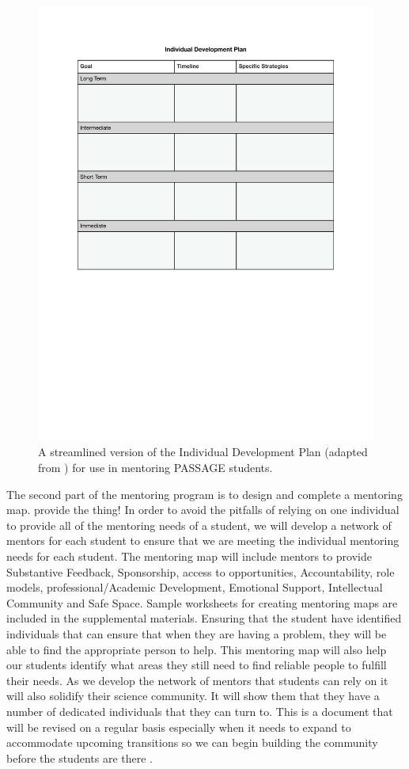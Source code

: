 \documentclass[12pt]{article}
\newcommand\new[1]{{\color{blue}#1}}
\begin{document}
\begin{figure}
    \centering
    \includegraphics[width=5in]{IDP.pdf}
    \caption{A streamlined version of the Individual Development Plan (adapted from \citet{Bosch}) for use in mentoring PASSAGE students.}
    \label{fig:IDP}
\end{figure}

The second part of the mentoring program is to design and complete a mentoring map. \new{provide the thing!} In order to avoid the pitfalls of relying on one individual to provide all of the mentoring needs of a student, we will develop a network of mentors for each student to ensure that we are meeting the individual mentoring needs for each student.  The mentoring map will include mentors to provide Substantive Feedback, Sponsorship, access to opportunities, Accountability, role models, professional/Academic Development, Emotional Support, Intellectual Community and Safe Space. Sample worksheets for creating mentoring maps are included in the supplemental materials.  Ensuring that the student have identified individuals that can ensure that when they are having a problem, they will be able to find the appropriate person to help. This mentoring map will also help our students identify what areas they still need to find reliable people to fulfill their needs.  As we develop the network of mentors that students can rely on it will also solidify their science community. It will show them that they have a number of dedicated individuals that they can turn to.  This is a document that will be revised on a regular basis especially when it needs to expand to accommodate upcoming transitions so we can begin building the community before the students are there \citep{NAP25568}. 
\end{document}
